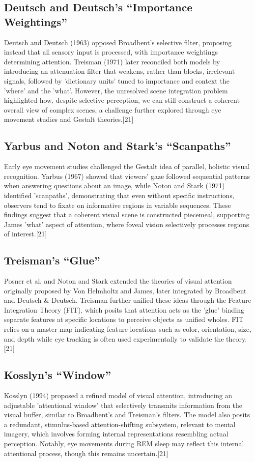 \documentclass[12pt]{report}
\begin{document}
\subsection{Deutsch and Deutsch's “Importance Weightings”}
Deutsch and Deutsch (1963) opposed Broadbent's selective filter, proposing instead that all sensory input is processed, with importance weightings determining attention.
Treisman (1971) later reconciled both models by introducing an attenuation filter that weakens, rather than blocks, irrelevant signals, followed by 'dictionary units' tuned to importance and context the 'where' and the 'what'. 
However, the unresolved scene integration problem highlighted how, despite selective perception, we can still construct a coherent overall view of complex scenes, a challenge further explored through eye movement studies and Gestalt theories.[21]

\subsection{Yarbus and Noton and Stark's “Scanpaths”}
Early eye movement studies challenged the Gestalt idea of parallel, holistic visual recognition. 
Yarbus (1967) showed that viewers' gaze followed sequential patterns when answering questions about an image, while Noton and Stark (1971) identified 'scanpaths', demonstrating that even without specific instructions, observers tend to fixate on informative regions in variable sequences. 
These findings suggest that a coherent visual scene is constructed piecemeal, supporting James 'what' aspect of attention, where foveal vision selectively processes regions of interest.[21]

\subsection{Treisman's “Glue”}
Posner et al. and Noton and Stark extended the theories of visual attention originally proposed by Von Helmholtz and James, later integrated by Broadbent and Deutsch \& Deutsch. 
Treisman further unified these ideas through the Feature Integration Theory (FIT), which posits that attention acts as the 'glue' binding separate features at specific locations to perceive objects as unified wholes. 
FIT relies on a master map indicating feature locations such as color, orientation, size, and depth while eye tracking is often used experimentally to validate the theory.[21]

\subsection{Kosslyn's “Window”}
Kosslyn (1994) proposed a refined model of visual attention, introducing an adjustable 'attentional window' that selectively transmits information from the visual buffer, similar to Broadbent's and Treisman's filters. 
The model also posits a redundant, stimulus-based attention-shifting subsystem, relevant to mental imagery, which involves forming internal representations resembling actual perception. 
Notably, eye movements during REM sleep may reflect this internal attentional process, though this remains uncertain.[21]
\end{document}

